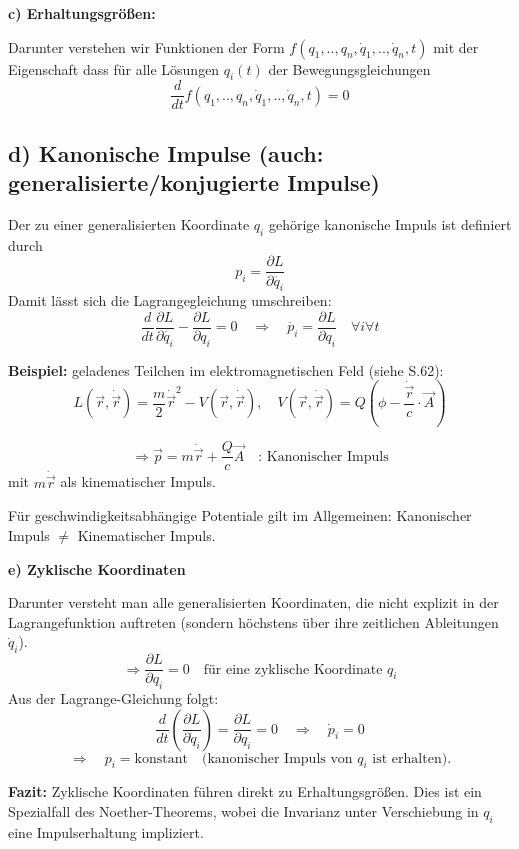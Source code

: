 \documentclass[10pt, letterpaper]{article}
\begin{document}
\textbf{c) Erhaltungsgrößen:}


Darunter verstehen wir Funktionen der Form $f(q_1,..,q_n,\dot{q}_1,..,\dot{q}_n,t)$ mit der Eigenschaft dass für alle Lösungen $q_i(t)$ der Bewegungsgleichungen
$$\frac{d}{dt}f(q_1,..,q_n,\dot{q}_1,..,\dot{q}_n,t) = 0$$




\subsection*{d) Kanonische Impulse (auch: generalisierte/konjugierte Impulse)}

Der zu einer generalisierten Koordinate $q_i$ gehörige kanonische Impuls ist definiert durch
\[p_i = \frac{\partial L}{\partial \dot{q_i}}\]
Damit lässt sich die Lagrangegleichung umschreiben:
\[\frac{d}{dt}\frac{\partial L}{\partial \dot{q_i}} - \frac{\partial L}{\partial q_i} = 0 \quad \Rightarrow \quad \dot{p_i} = \frac{\partial L}{\partial q_i} \quad \forall i \forall t\]




\textbf{Beispiel:} geladenes Teilchen im elektromagnetischen Feld (siehe S.62):
\[L(\vec{r},\dot{\vec{r}}) = \frac{m}{2}\dot{\vec{r}}^2 - V(\vec{r},\dot{\vec{r}}), \quad V(\vec{r},\dot{\vec{r}}) = Q(\phi - \frac{\dot{\vec{r}}}{c}\cdot\vec{A})\]

\[\Rightarrow \vec{p} = m\dot{\vec{r}} + \frac{Q}{c}\vec{A} \quad \text{: Kanonischer Impuls}\]
mit $m\dot{\vec{r}}$ als kinematischer Impuls. 

Für geschwindigkeitsabhängige Potentiale gilt im Allgemeinen:
Kanonischer Impuls $\neq$ Kinematischer Impuls.





\textbf{e) Zyklische Koordinaten}

Darunter versteht man alle generalisierten Koordinaten, die nicht explizit in der Lagrangefunktion auftreten (sondern höchstens über ihre zeitlichen Ableitungen \( \dot{q}_i \)).
\[
\Rightarrow \frac{\partial L}{\partial q_i} = 0 
\quad \text{für eine zyklische Koordinate } q_i
\]
Aus der Lagrange-Gleichung folgt:
\[
\frac{d}{dt} \left( \frac{\partial L}{\partial \dot{q}_i} \right) = \frac{\partial L}{\partial q_i} = 0
\quad \Rightarrow \quad \dot{p}_i = 0
\]
\[
\Rightarrow \quad p_i = \text{konstant}
\quad \text{(kanonischer Impuls von } q_i \text{ ist erhalten).}
\]

\noindent
\textbf{Fazit:}  
Zyklische Koordinaten führen direkt zu Erhaltungsgrößen. Dies ist ein Spezialfall des Noether-Theorems, wobei die Invarianz unter Verschiebung in \( q_i \) eine Impulserhaltung impliziert.
\end{document}

